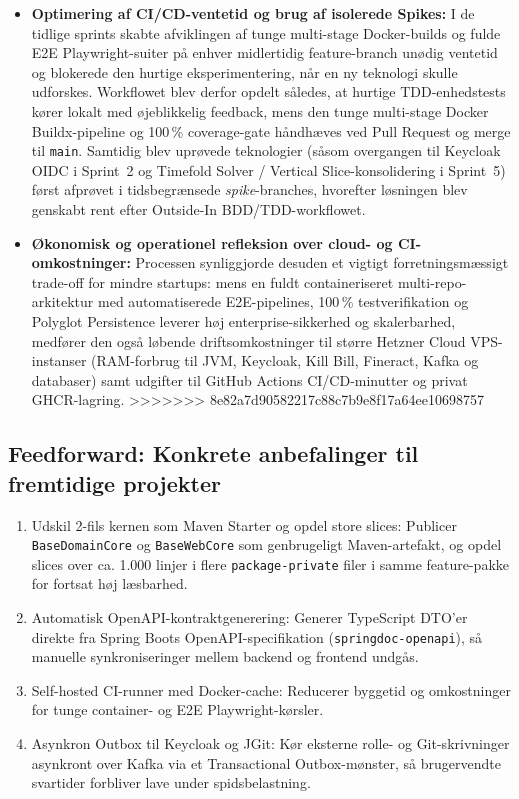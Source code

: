 \documentclass[11pt,a4paper]{article}
\begin{document}
\begin{table}[htbp]
\begin{table}[htbp]
\begin{itemize}[noitemsep]
    \item \textbf{Optimering af CI/CD-ventetid og brug af isolerede Spikes:} I de tidlige sprints skabte afviklingen af tunge multi-stage Docker-builds og fulde E2E Playwright-suiter på enhver midlertidig feature-branch unødig ventetid og blokerede den hurtige eksperimentering, når en ny teknologi skulle udforskes. Workflowet blev derfor opdelt således, at hurtige TDD-enhedstests kører lokalt med øjeblikkelig feedback, mens den tunge multi-stage Docker Buildx-pipeline og 100\,\% coverage-gate håndhæves ved Pull Request og merge til \texttt{main}. Samtidig blev uprøvede teknologier (såsom overgangen til Keycloak OIDC i Sprint~2 og Timefold Solver / Vertical Slice-konsolidering i Sprint~5) først afprøvet i tidsbegrænsede \textit{spike}-branches, hvorefter løsningen blev genskabt rent efter Outside-In BDD/TDD-workflowet.
    \item \textbf{Økonomisk og operationel refleksion over cloud- og CI-omkostninger:} Processen synliggjorde desuden et vigtigt forretningsmæssigt trade-off for mindre startups: mens en fuldt containeriseret multi-repo-arkitektur med automatiserede E2E-pipelines, 100\,\% testverifikation og Polyglot Persistence leverer høj enterprise-sikkerhed og skalerbarhed, medfører den også løbende driftsomkostninger til større Hetzner Cloud VPS-instanser (RAM-forbrug til JVM, Keycloak, Kill Bill, Fineract, Kafka og databaser) samt udgifter til GitHub Actions CI/CD-minutter og privat GHCR-lagring.
>>>>>>> 8e82a7d90582217c88c7b9e8f17a64ee10698757
\end{itemize}

\subsection{Feedforward: Konkrete anbefalinger til fremtidige projekter}
\begin{enumerate}[noitemsep]
    \item Udskil 2-fils kernen som Maven Starter og opdel store slices: Publicer \texttt{BaseDomainCore} og \texttt{BaseWebCore} som genbrugeligt Maven-artefakt, og opdel slices over ca. 1.000 linjer i flere \texttt{package-private} filer i samme feature-pakke for fortsat høj læsbarhed.
    \item Automatisk OpenAPI-kontraktgenerering: Generer TypeScript DTO'er direkte fra Spring Boots OpenAPI-specifikation (\texttt{springdoc-openapi}), så manuelle synkroniseringer mellem backend og frontend undgås.
    \item Self-hosted CI-runner med Docker-cache: Reducerer byggetid og omkostninger for tunge container- og E2E Playwright-kørsler.
    \item Asynkron Outbox til Keycloak og JGit: Kør eksterne rolle- og Git-skrivninger asynkront over Kafka via et Transactional Outbox-mønster, så brugervendte svartider forbliver lave under spidsbelastning.
\end{enumerate}


\end{table}
\end{table}
\end{document}
